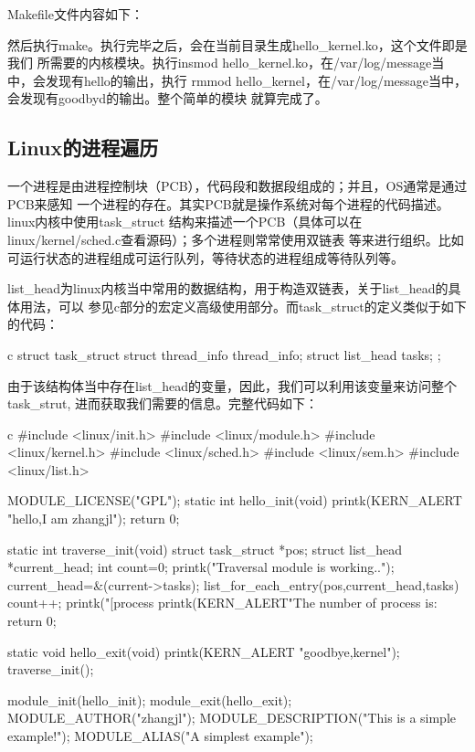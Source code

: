 Makefile文件内容如下：

然后执行make。执行完毕之后，会在当前目录生成hello\_kernel.ko，这个文件即是我们
所需要的内核模块。执行insmod hello\_kernel.ko，在/var/log/message当中，会发现有hello的输出，执行
rmmod hello\_kernel，在/var/log/message当中，会发现有goodbyd的输出。整个简单的模块
就算完成了。

\subsection{Linux的进程遍历}
一个进程是由进程控制块（PCB），代码段和数据段组成的；并且，OS通常是通过PCB来感知
一个进程的存在。其实PCB就是操作系统对每个进程的代码描述。linux内核中使用task\_struct
结构来描述一个PCB（具体可以在linux/kernel/sched.c查看源码）；多个进程则常常使用双链表
等来进行组织。比如可运行状态的进程组成可运行队列，等待状态的进程组成等待队列等。

list\_head为linux内核当中常用的数据结构，用于构造双链表，关于list\_head的具体用法，可以
参见c部分的宏定义高级使用部分。而task\_struct的定义类似于如下的代码：
\begin{code-block}{c}
struct task_struct {
        struct thread_info    thread_info;
        struct list_head      tasks;
};
\end{code-block}

由于该结构体当中存在list\_head的变量，因此，我们可以利用该变量来访问整个task\_strut,
进而获取我们需要的信息。完整代码如下：
\begin{code-block}{c}
#include <linux/init.h>
#include <linux/module.h>
#include <linux/kernel.h>
#include <linux/sched.h>
#include <linux/sem.h>
#include <linux/list.h>

MODULE_LICENSE("GPL");
static int hello_init(void)
{
        printk(KERN_ALERT "hello,I am zhangjl\n");
        return 0;
}

static int traverse_init(void)
{
       struct task_struct *pos;
       struct list_head *current_head;
       int count=0;
       printk("Traversal module is working..\n");
       current_head=&(current->tasks);
       list_for_each_entry(pos,current_head,tasks)
       {
              count++;
              printk("[process %
       }
       printk(KERN_ALERT"The number of process is:%
       return 0;
}

static void hello_exit(void)
{
    printk(KERN_ALERT "goodbye,kernel\n");
    traverse_init();
}

module_init(hello_init);
module_exit(hello_exit);
MODULE_AUTHOR("zhangjl");
MODULE_DESCRIPTION("This is a simple example!\n");
MODULE_ALIAS("A simplest example");

\end{code-block}

